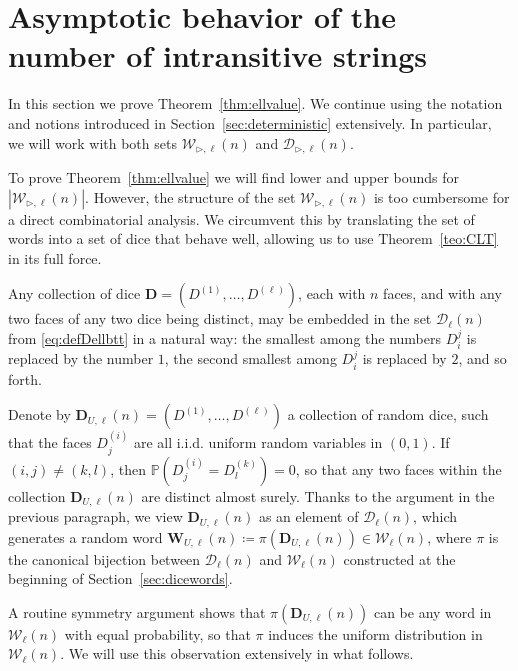 \documentclass[reqno,a4paper,11pt]{amsart}
\newcommand{\btt}{\triangleright}
\theoremstyle{remark}
\newcommand{\mc}[1]{{\mathcal #1}}
\newcommand{\mb}[1]{{\mathbf #1}}
\newcommand{\bb}[1]{{\mathbb #1}}
\numberwithin{equation}{section}
\begin{document}
\section{Asymptotic behavior of the number of intransitive strings}\label{sec:stringsAsymptotics}

In this section we prove Theorem~\ref{thm:ellvalue}. We continue using the notation and notions introduced in Section~\ref{sec:deterministic} extensively. In particular, we will work with both sets $\mc W_{\btt, \ell}(n)$ and $\mc D_{\btt, \ell}(n)$.

To prove Theorem~\ref{thm:ellvalue} we will find lower and upper bounds for $|\mc W_{\btt, \ell}(n)|$. However, the structure of the set $\mc W_{\btt, \ell}(n)$ is too cumbersome for a direct combinatorial analysis. We circumvent this by translating the set of words into a set of dice that behave well, allowing us to use Theorem~\ref{teo:CLT} in its full force. 

Any collection of dice $\mb D=(D^{(1)},\hdots, D^{(\ell)})$, each with $n$ faces, and with any two faces of any two dice being distinct, may be embedded in the set $\mc D_\ell(n)$ from \eqref{eq:defDellbtt} in a natural way: the smallest among the numbers $D^{j}_i$ is replaced by the number $1$, the second smallest among $D^{j}_i$ is replaced by $2$, and so forth. 

Denote by $\mb D_{U, \ell}(n)=(D^{(1)}, \dots, D^{(\ell)})$ a collection of random dice, such that the faces $D^{(i)}_j$ are all i.i.d. uniform random variables in $(0, 1)$. If $(i, j) \neq (k, l)$, then $\bb P(D^{(i)}_j=D^{(k)}_l)=0$, so that any two faces within the collection $\mb D_{U,\ell}(n)$ are distinct almost surely. Thanks to the argument in the previous paragraph, we view $\mb D_{U,\ell}(n)$ as an element of $\mc D_\ell(n)$, which generates a random word $\mb W_{U,\ell}(n)\coloneqq\pi (\mb D_{U,\ell}(n))\in \mc W_\ell(n)$, where $\pi$ is the canonical bijection between $\mc D_\ell(n)$ and $\mc W_\ell(n)$ constructed at the beginning of Section~\ref{sec:dicewords}.

A routine symmetry argument shows that $\pi(\mb D_{U, \ell}(n))$ can be any word in $\mc W_{\ell}(n)$ with equal probability, so that $\pi$ induces the uniform distribution in $\mc W_{\ell}(n)$. We will use this observation extensively in what follows.
\end{document}
